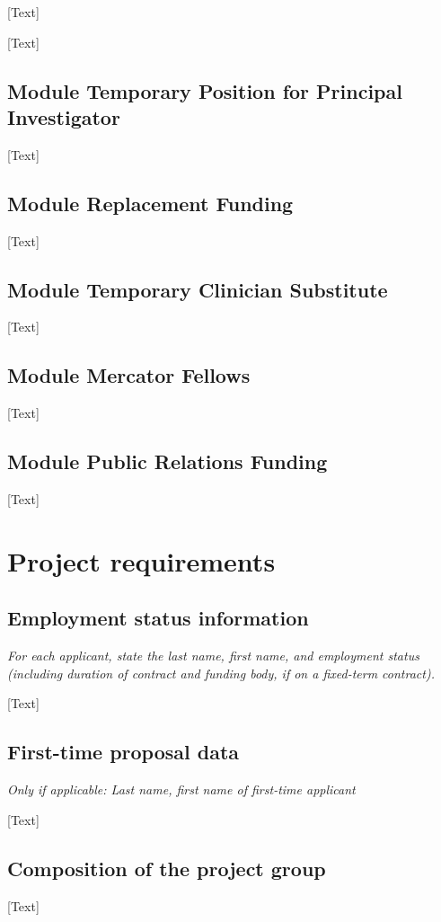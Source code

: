 \documentclass[red]{dfg_proposal_en}
\begin{document}
[Text]

[Text]

\subsection{Module Temporary Position for Principal Investigator}
[Text]

\subsection{Module Replacement Funding}
[Text]

\subsection{Module Temporary Clinician Substitute}
[Text]

\subsection{Module Mercator Fellows}
[Text]

\subsection{Module Public Relations Funding}
[Text]

\section{Project requirements}

\subsection{Employment status information}
\textit{For each applicant, state the last name, first name, and employment status (including duration of contract and funding body, if on a fixed-term contract).}

[Text]

\subsection{First-time proposal data}
\textit{Only if applicable: Last name, first name of first-time applicant}

[Text]

\subsection{Composition of the project group}
[Text]
\end{document}
